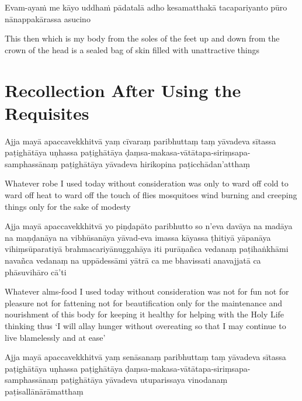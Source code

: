 Evam-ayaṁ me kāyo uddhaṁ pādatalā adho kesamatthakā tacapariyanto pūro nānappakārassa asucino

\begin{english}
  This then which is my body from the soles of the feet up and down from the crown of the head is a sealed bag of skin filled with unattractive things
\end{english}


\clearpage

\section{Recollection After Using the Requisites}

\begin{leader}
\end{leader}


Ajja mayā apaccavekkhitvā yaṃ cīvaraṃ paribhuttaṃ taṃ yāvadeva sītassa
paṭighātāya uṇhassa paṭighātāya ḍaṃsa-makasa-vātātapa-siriṃsapa-samphassānaṃ
paṭighātāya yāvadeva hirikopina paṭicchādan'atthaṃ

\begin{english}
  Whatever robe I used today without consideration was only to ward off cold
  to ward off heat to ward off the touch of flies mosquitoes wind burning
  and creeping things only for the sake of modesty
\end{english}

Ajja mayā apaccavekkhitvā yo piṇḍapāto paribhutto so n'eva davāya na madāya
na maṇḍanāya na vibhūsanāya yāvad-eva imassa kāyassa ṭhitiyā yāpanāya
vihiṃsūparatiyā brahmacariyānuggahāya iti purāṇañca vedanaṃ paṭihaṅkhāmi
navañca vedanaṃ na uppādessāmi yātrā ca me bhavissati anavajjatā ca phāsuvihāro
cā'ti

\begin{english}
  Whatever alms-food I used today without consideration was not for fun not
  for pleasure not for fattening not for beautification only for the
  maintenance and nourishment of this body for keeping it healthy for helping
  with the Holy Life thinking thus `I will allay hunger without overeating so
  that I may continue to live blamelessly and at ease'
\end{english}

Ajja mayā apaccavekkhitvā yaṃ senāsanaṃ paribhuttaṃ taṃ yāvadeva sītassa
paṭighātāya uṇhassa paṭighātāya ḍaṃsa-makasa-vātātapa-siriṃsapa-samphassānaṃ
paṭighātāya yāvadeva utuparissaya vinodanaṃ paṭisallānārāmatthaṃ

